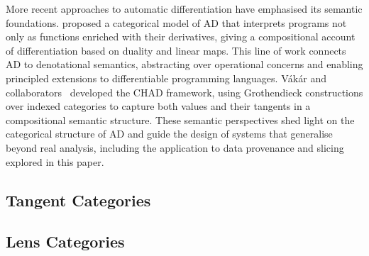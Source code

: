 More recent approaches to automatic differentiation have emphasised its semantic foundations.
\citet{elliott18} proposed a categorical model of AD that interprets programs not only as functions enriched
with their derivatives, giving a compositional account of differentiation based on duality and linear maps.
This line of work connects AD to denotational semantics, abstracting over operational concerns and enabling
principled extensions to differentiable programming languages. Vákár and
collaborators~\cite{vákár22,nunes2023} developed the CHAD framework, using Grothendieck constructions over
indexed categories to capture both values and their tangents in a compositional semantic structure. These
semantic perspectives shed light on the categorical structure of AD and guide the design of systems that
generalise beyond real analysis, including the application to data provenance and slicing explored in this
paper.

\subsection{\GPS}
\label{sec:related-work:galois-slicing}

\cite{perera12a,perera13,perera16d,ricciotti17,perera22,bond25}

\subsection{Tangent Categories}

\cite{cockett14,cockett18}

\subsection{Lens Categories}

\cite{spivak19}
